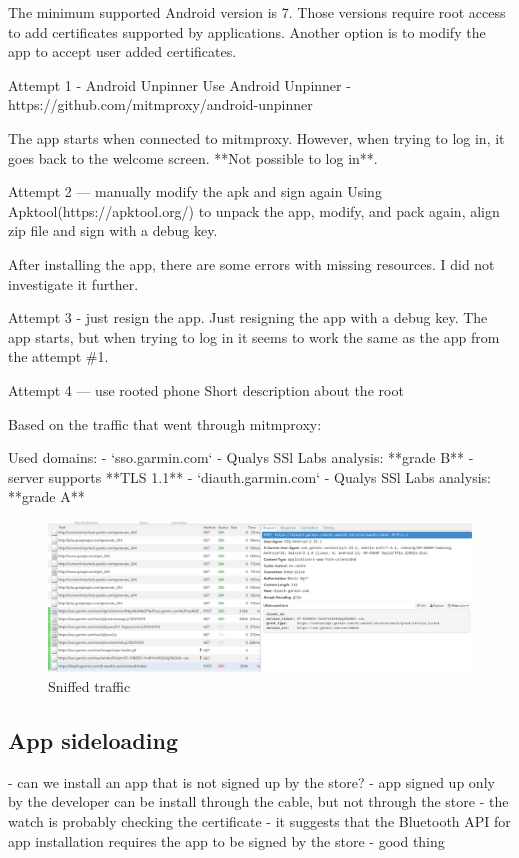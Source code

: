 The minimum supported Android version is 7.
Those versions require root access to add certificates supported by applications.
Another option is to modify the app to accept user added certificates.

Attempt 1 - Android Unpinner
Use Android Unpinner - https://github.com/mitmproxy/android-unpinner

The app starts when connected to mitmproxy.
However, when trying to log in, it goes back to the welcome screen.
**Not possible to log in**.

Attempt 2 — manually modify the apk and sign again
Using Apktool(https://apktool.org/) to unpack the app, modify, and pack again, align zip file and sign with a debug key.

After installing the app, there are some errors with missing resources.
I did not investigate it further.

Attempt 3 - just resign the app.
Just resigning the app with a debug key.
The app starts, but when trying to log in it seems to work the same as the app from the attempt \#1.

Attempt 4 — use rooted phone
Short description about the root

Based on the traffic that went through mitmproxy:

Used domains:
- `sso.garmin.com` - Qualys SSl Labs analysis: **grade B**
- server supports **TLS 1.1**
- `diauth.garmin.com` - Qualys SSl Labs analysis: **grade A**

\begin{figure}[h]
    \centering
    \includegraphics[width=1\linewidth]{../../images/mitmproxy unpinner}
    \caption{Sniffed traffic}
    \label{fig:mitmproxy-unpinner}
\end{figure}

\subsection{App sideloading}
- can we install an app that is not signed up by the store?
- app signed up only by the developer can be install through the cable, but not through the store
- the watch is probably checking the certificate
- it suggests that the Bluetooth API for app installation requires the app to be signed by the store - good thing
